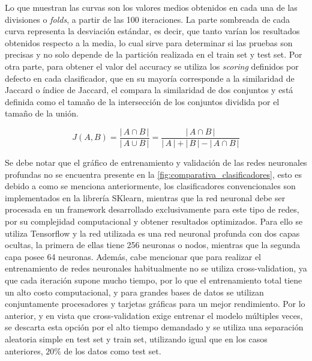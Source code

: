 Lo que muestran las curvas son los valores medios obtenidos en cada una de las divisiones o \textit{folds}, a partir de las 100 iteraciones. La parte sombreada de cada curva representa la desviación estándar, es decir, que tanto varían los resultados obtenidos respecto a la media, lo cual sirve para determinar si las pruebas son precisas y no solo depende de la partición realizada en el train set y test set. Por otra parte, para obtener el valor del accuracy se utiliza los \textit{scoring} definidos por defecto en cada clasificador, que en su mayoría corresponde a la similaridad de Jaccard o índice de Jaccard, el compara la similaridad de dos conjuntos y está definida como el tamaño de la intersección de los conjuntos dividida por el tamaño de la unión.

\begin{equation}
J(A, B) = \frac{| \, A \cap B \, |}{| \, A \cup B \,|} =  \frac{| \, A \cap B \, |}{|\, A \,| + |\, B \,|  - | \, A \cap B \, |}
\end{equation}

Se debe notar que el gráfico de entrenamiento y validación de las redes neuronales profundas no se encuentra presente en la \autoref{fig:comparativa_clasificadores}, esto es debido a como se menciona anteriormente, los clasificadores convencionales son implementados en la librería SKlearn, mientras que la red neuronal debe ser procesada en un framework desarrollado exclusivamente para este tipo de redes, por su complejidad computacional y obtener resultados optimizados. Para ello se utiliza Tensorflow y la red utilizada es una red neuronal profunda con dos capas ocultas, la primera de ellas tiene 256 neuronas o nodos, mientras que la segunda capa posee 64 neuronas. Además, cabe mencionar que para realizar el entrenamiento de redes neuronales habitualmente no se utiliza cross-validation, ya que cada iteración supone mucho tiempo, por lo que el entrenamiento total tiene un alto costo computacional, y para grandes bases de datos se utilizan conjuntamente procesadores y tarjetas gráficas para un mejor rendimiento. Por lo anterior, y en vista que cross-validation exige entrenar el modelo múltiples veces, se descarta esta opción por el alto tiempo demandado y se utiliza una separación aleatoria simple en test set y train set, utilizando igual que en los casos anteriores, $20\%$ de los datos como test set.

